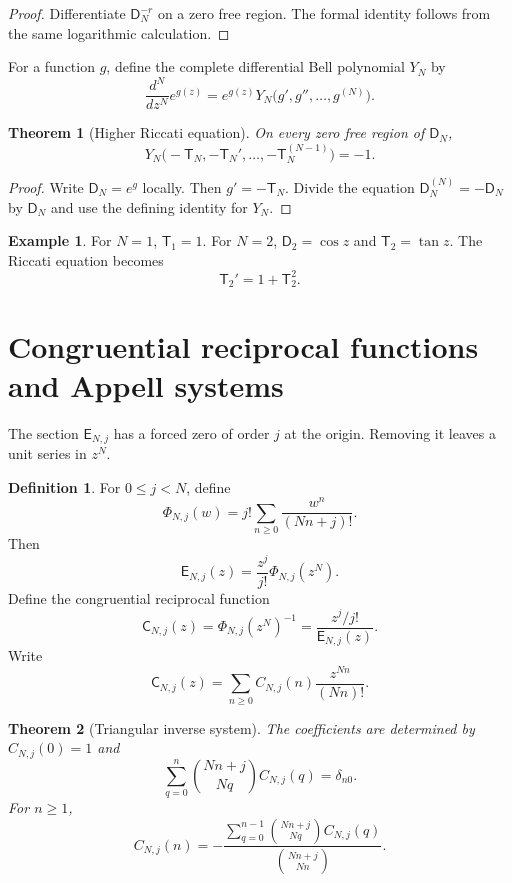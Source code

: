 \documentclass{aomart}
\newtheorem{theorem}{Theorem}[section]
\theoremstyle{definition}
\newtheorem{definition}[definition]{Definition}
\newtheorem{example}[example]{Example}
\theoremstyle{remark}
\newcommand{\Dfun}{\mathsf D}
\newcommand{\Efun}{\mathsf E}
\newcommand{\Tfun}{\mathsf T}
\newcommand{\Cfun}{\mathsf C}
\begin{document}
\begin{proof}
Differentiate $\Dfun_N^{-r}$ on a zero free region.  The formal identity follows from the same logarithmic calculation.
\end{proof}

For a function $g$, define the complete differential Bell polynomial $Y_N$ by
\[
\frac{d^N}{dz^N}e^{g(z)}
=
e^{g(z)}Y_N\bigl(g',g'',\ldots,g^{(N)}\bigr).
\]

\begin{theorem}[Higher Riccati equation]\label{thm:higher_riccati}
On every zero free region of $\Dfun_N$,
\[
Y_N\bigl(
-\Tfun_N,
-\Tfun_N',
\ldots,
-\Tfun_N^{(N-1)}
\bigr)
=-1.
\]
\end{theorem}

\begin{proof}
Write $\Dfun_N=e^g$ locally.  Then $g'=-\Tfun_N$.  Divide the equation $\Dfun_N^{(N)}=-\Dfun_N$ by $\Dfun_N$ and use the defining identity for $Y_N$.
\end{proof}

\begin{example}\label{ex:ordinary_tangent}
For $N=1$, $\Tfun_1=1$.  For $N=2$, $\Dfun_2=\cos z$ and $\Tfun_2=\tan z$.  The Riccati equation becomes
\[
\Tfun_2'=1+\Tfun_2^2.
\]
\end{example}

\section{Congruential reciprocal functions and Appell systems}\label{sec:congruential}

The section $\Efun_{N,j}$ has a forced zero of order $j$ at the origin.  Removing it leaves a unit series in $z^N$.

\begin{definition}\label{def:normalized_section}
For $0\leq j<N$, define
\[
\Phi_{N,j}(w)
=
j!\sum_{n\geq0}\frac{w^n}{(Nn+j)!}.
\]
Then
\[
\Efun_{N,j}(z)
=
\frac{z^j}{j!}\Phi_{N,j}(z^N).
\]
Define the congruential reciprocal function
\[
\Cfun_{N,j}(z)
=
\Phi_{N,j}(z^N)^{-1}
=
\frac{z^j/j!}{\Efun_{N,j}(z)}.
\]
Write
\[
\Cfun_{N,j}(z)
=
\sum_{n\geq0}C_{N,j}(n)\frac{z^{Nn}}{(Nn)!}.
\]
\end{definition}

\begin{theorem}[Triangular inverse system]\label{thm:triangular_inverse}
The coefficients are determined by $C_{N,j}(0)=1$ and
\[
\sum_{q=0}^{n}
\binom{Nn+j}{Nq}
C_{N,j}(q)
=
\delta_{n0}.
\]
For $n\geq1$,
\[
C_{N,j}(n)
=
-
\frac{
\displaystyle\sum_{q=0}^{n-1}
\binom{Nn+j}{Nq}C_{N,j}(q)
}{
\displaystyle\binom{Nn+j}{Nn}
}.
\]
\end{theorem}
\end{document}
